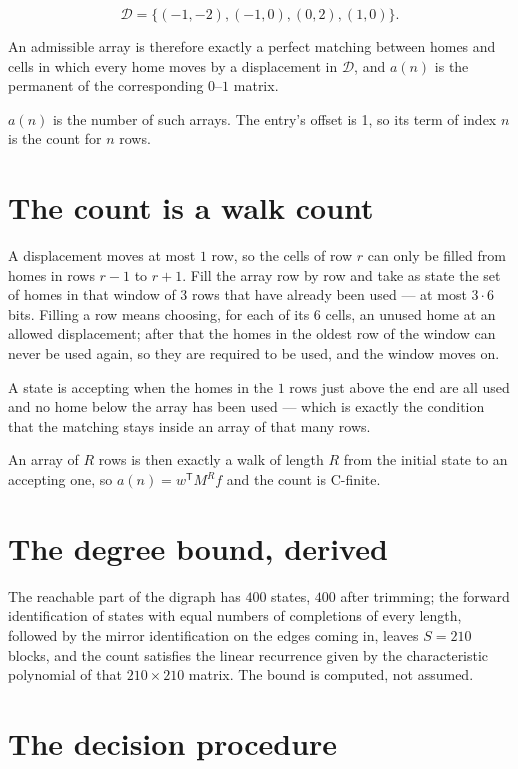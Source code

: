 \documentclass[11pt]{article}
\theoremstyle{definition}
\begin{document}
\[\mathcal{D} = \{(-1,-2), (-1,0), (0,2), (1,0)\}.\]

An admissible array is therefore exactly a perfect matching between homes and cells in which every home moves by a displacement in $\mathcal{D}$, and $a(n)$ is the permanent of the corresponding $0$--$1$ matrix.

$a(n)$ is the number of such arrays. The entry's offset is 1, so its term of index $n$ is the count for $n$ rows.

\section{The count is a walk count}

A displacement moves at most $1$ row, so the cells of row $r$ can only be filled from homes in rows $r-1$ to $r+1$. Fill the array row by row and take as state the set of homes in that window of $3$ rows that have already been used --- at most $3\cdot6$ bits. Filling a row means choosing, for each of its $6$ cells, an unused home at an allowed displacement; after that the homes in the oldest row of the window can never be used again, so they are required to be used, and the window moves on.

A state is accepting when the homes in the $1$ rows just above the end are all used and no home below the array has been used --- which is exactly the condition that the matching stays inside an array of that many rows.

An array of $R$ rows is then exactly a walk of length $R$ from the initial state to an accepting one, so $a(n) = w^{\mathsf T}M^{R}f$ and the count is C-finite.

\section{The degree bound, derived}

The reachable part of the digraph has $400$ states, $400$ after trimming; the forward identification of states with equal numbers of completions of every length, followed by the mirror identification on the edges coming in, leaves $S = 210$ blocks, and the count satisfies the linear recurrence given by the characteristic polynomial of that $210\times210$ matrix. The bound is computed, not assumed.

\section{The decision procedure}
\end{document}
